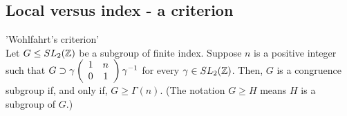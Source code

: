 \subsection{Local versus index - a criterion}

\begin{theorem} {'Wohlfahrt's criterion'} \label{thm:criterion}\\
Let $G \leq SL_2(\mathbb{Z})$ be a subgroup of finite index. Suppose $n$ is a positive integer such that $G \supset \gamma \left(\begin{array}{ c c } 1 & n \\ 0 & 1 \end{array} \right) \gamma^{-1}$ for every $\gamma \in 
SL_2(\mathbb{Z})$. Then, $G$ is a congruence subgroup if, and only if, $G \geq \Gamma(n)$. (The notation $G \geq H$ means $H$ is a subgroup of $G$.)
\end{theorem}
